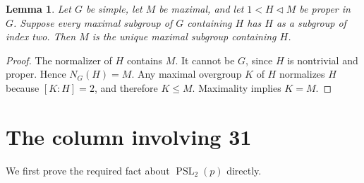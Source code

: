 \documentclass[11pt,a4paper]{article}
\newtheorem{lemma}[theorem]{Lemma}
\newcommand{\PSL}{\operatorname{PSL}}
\begin{document}
\begin{lemma}\label{normalizer}
Let $G$ be simple, let $M$ be maximal, and let $1<H\lhd M$ be proper
in $G$. Suppose every maximal subgroup of $G$ containing $H$ has
$H$ as a subgroup of index two. Then $M$ is the unique maximal
subgroup containing $H$.
\end{lemma}
\begin{proof}
The normalizer of $H$ contains $M$. It cannot be $G$, since $H$ is
nontrivial and proper. Hence $N_G(H)=M$. Any maximal overgroup $K$ of
$H$ normalizes $H$ because $[K:H]=2$, and therefore $K\leq M$.
Maximality implies $K=M$.
\end{proof}

\section{The column involving 31}
We first prove the required fact about $\PSL_2(p)$ directly.
\end{document}
